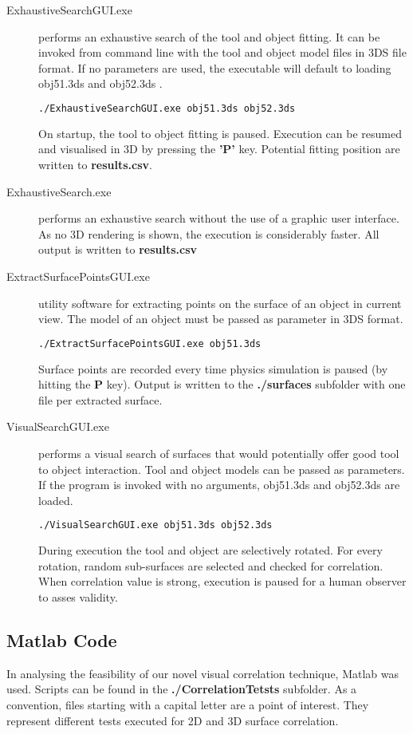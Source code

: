 \documentclass{article}
\begin{document}
\begin{description}

  \item [ExhaustiveSearchGUI.exe] performs an exhaustive search of the tool and object fitting. It can be invoked from command line with the tool and object model files 	in 3DS file format. If no parameters are used, the executable will default to loading obj51.3ds and obj52.3ds .

    \begin{lstlisting}[language=bash]
  ./ExhaustiveSearchGUI.exe obj51.3ds obj52.3ds
    \end{lstlisting}

    On startup, the tool to object fitting is paused. Execution can be resumed and visualised in 3D by pressing the \textbf{'P'} key.
    Potential fitting position are written to \textbf{results.csv}.

  \item [ExhaustiveSearch.exe] performs an exhaustive search without the use of a graphic user interface. As no 3D rendering is shown, the execution is considerably faster. All output is written to \textbf{results.csv}

  \item [ExtractSurfacePointsGUI.exe] utility software for extracting points on the surface of an object in current view. The model of an object must be passed as parameter in 3DS format. 

    \begin{lstlisting}[language=bash]
  ./ExtractSurfacePointsGUI.exe obj51.3ds
    \end{lstlisting}

    Surface points are recorded every time physics simulation is paused (by hitting the \textbf{P} key).
    Output is written to the \textbf{./surfaces} subfolder with one file per extracted surface.   

  \item [VisualSearchGUI.exe] performs a visual search of surfaces that would potentially offer good tool to object interaction. Tool and object models can be passed as parameters. If the program is invoked with no arguments, obj51.3ds and obj52.3ds are loaded.
    
    \begin{lstlisting}[language=bash]
  ./VisualSearchGUI.exe obj51.3ds obj52.3ds
    \end{lstlisting}

    During execution the tool and object are selectively rotated. For every rotation, random sub-surfaces are selected and checked for correlation.
    When correlation value is strong, execution is paused for a human observer to asses validity. 
\end{description}

\subsection{Matlab Code}
In analysing the feasibility of our novel visual correlation technique, Matlab was used. Scripts can be found in the \textbf{./CorrelationTetsts} subfolder. 
As a convention, files starting with a capital letter are a point of interest.
They represent different tests executed for 2D and 3D surface correlation. 
\end{document}

